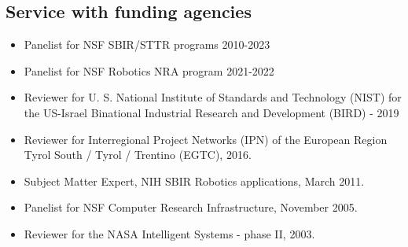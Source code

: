 \subsection*{Service with funding agencies}
    
\begin{itemize}

\item Panelist for NSF SBIR/STTR programs 2010-2023

\item Panelist for NSF Robotics NRA program 2021-2022

\item Reviewer for U. S. National Institute of Standards and Technology (NIST) for the US-Israel Binational Industrial Research and Development (BIRD) - 2019

\item Reviewer for Interregional Project Networks (IPN) of the European Region Tyrol South / Tyrol / Trentino (EGTC), 2016.


\item Subject Matter Expert, NIH SBIR Robotics applications, March 2011.

\item Panelist for NSF Computer Research Infrastructure, November 2005.

\item Reviewer for the NASA Intelligent Systems - phase II, 2003.

\end{itemize}
